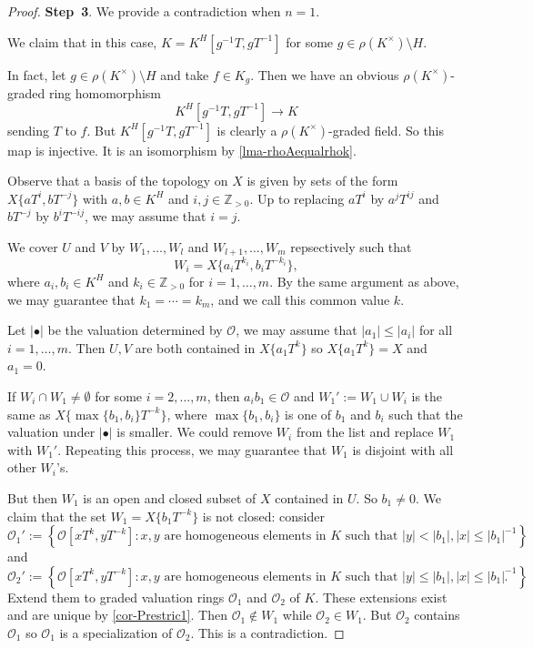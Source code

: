 \begin{proof}
    \textbf{Step~3}. We provide a contradiction when $n=1$.

    We claim that in this case, $K=K^H[g^{-1}T,gT^{-1}]$ for some $g\in \rho(K^{\times})\setminus H$.

    In fact, let $g\in \rho(K^{\times})\setminus H$ and take $f\in K_{g}$. Then we have an obvious $\rho(K^{\times})$-graded ring homomorphism
    \[
        K^H[g^{-1}T,gT^{-1}]\rightarrow K
    \]
    sending $T$ to $f$. But $K^H[g^{-1}T,gT^{-1}]$ is clearly a $\rho(K^{\times})$-graded field. So this map is injective. It is an isomorphism by \cref{lma-rhoAequalrhok}.

    Observe that a basis of the topology on $X$ is given by sets of the form $X\{aT^i,bT^{-j}\}$ with $a,b\in K^H$ and $i,j\in \mathbb{Z}_{>0}$. Up to replacing $aT^i$ by $a^jT^{ij}$ and $bT^{-j}$ by $b^iT^{-ij}$, we may assume that $i=j$.

    We cover $U$ and $V$ by $W_1,\ldots,W_l$ and $W_{l+1},\ldots,W_{m}$ repsectively such that
    \[
        W_i=X\{a_iT^{k_i},b_iT^{-k_i}\},
    \]
    where $a_i,b_i\in K^H$ and $k_i\in \mathbb{Z}_{>0}$ for $i=1,\ldots,m$. By the same argument as above, we may guarantee that $k_1=\cdots=k_m$, and we call this common value $k$.

    Let $|\bullet|$ be the valuation determined by $\mathcal{O}$, we may assume that $|a_1|\leq |a_i|$ for all $i=1,\ldots,m$. Then $U,V$ are both contained in $X\{a_1T^k\}$ so $X\{a_1T^k\}=X$ and $a_1=0$.

    If $W_i\cap W_1\neq \emptyset$ for some $i=2,\ldots,m$, then $a_ib_1\in \mathcal{O}$ and $W_1':=W_1\cup W_i$ is the same as $X\{\max\{b_1,b_i\}T^{-k}\}$, where $\max\{b_1,b_i\}$ is one of $b_1$ and $b_i$ such that the valuation under $|\bullet|$ is smaller. We could remove $W_i$ from the list and replace $W_1$ with $W_1'$. Repeating this process, we may guarantee that $W_1$ is disjoint with all other $W_i$'s.

    But then $W_1$ is an open and closed subset of $X$ contained in $U$. So $b_1\neq 0$. We claim that the set $W_1=X\{b_1T^{-k}\}$ is not closed: consider 
    \[
        \mathcal{O}_1':=\left\{ \mathcal{O}[xT^k,yT^{-k}]: x,y\text{ are homogeneous elements in } K\text{ such that }|y|<|b_1|, |x|\leq |b_1|^{-1} \right\}  
    \]
    and 
    \[
        \mathcal{O}_2':=\left\{ \mathcal{O}[xT^k,yT^{-k}]: x,y\text{ are homogeneous elements in } K\text{ such that }|y|\leq |b_1|, |x|\leq |b_1|^{-1} \right\}.  
    \]
    Extend them to graded valuation rings $\mathcal{O}_1$ and $\mathcal{O}_2$  of $K$. These extensions exist and are unique by \cref{cor-Prestric1}.
    Then $\mathcal{O}_1\not\in W_1$ while $\mathcal{O}_2\in W_1$. But $\mathcal{O}_2$ contains $\mathcal{O}_1$ so $\mathcal{O}_1$ is a specialization of $\mathcal{O}_2$. This is a contradiction.


\end{proof}
